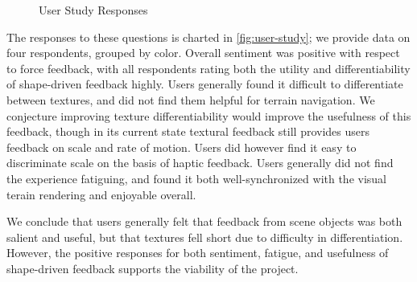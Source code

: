 \begin{figure}
    \caption{User Study Responses}
    \label{fig:user-study}
\end{figure}

The responses to these questions is charted in \autoref{fig:user-study}; we provide data on four respondents, grouped by color. Overall sentiment was positive with respect to force feedback, with all respondents rating both the utility and differentiability of shape-driven feedback highly.
Users generally found it difficult to differentiate between textures, and did not find them helpful for terrain navigation. We conjecture improving texture differentiability would improve the usefulness of this feedback, though in its current state textural feedback still provides users feedback on scale and rate of motion. Users did however find it easy to discriminate scale on the basis of haptic feedback.
Users generally did not find the experience fatiguing, and found it both well-synchronized with the visual terain rendering and enjoyable overall.

We conclude that users generally felt that feedback from scene objects was both salient and useful, but that textures fell short due to difficulty in differentiation. However, the positive responses for both sentiment, fatigue, and usefulness of shape-driven feedback supports the viability of the project.
